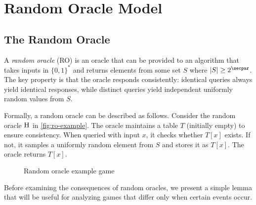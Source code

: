 \section{Random Oracle Model}\label{sec:rom}

\subsection{The Random Oracle}

A \emph{random oracle} (RO) is an oracle that can be provided to an algorithm that takes inputs in $\{0, 1\}^*$ and returns elements from some set $S$ where $|S| \geq 2^\secpar$.
The key property is that the oracle responds consistently: identical queries always yield identical responses, while distinct queries yield independent uniformly random values from $S$.

Formally, a random oracle can be described as follows.
Consider the random oracle ${\normalfont\textsc{H}}$ in \autoref{fig:ro-example}.
The oracle maintains a table $T$ (initially empty) to ensure consistency.
When queried with input $x$, it checks whether $T[x]$ exists. If not, it samples a uniformly random element from $S$ and stores it as $T[x]$.
The oracle returns $T[x]$.


\begin{figure}[tbhp]
  \begin{center}
    \begin{tcolorbox}[width=8cm]
      \begin{pchstack}
        \pchspace
      \end{pchstack}
    \end{tcolorbox}
  \end{center}
  \caption{Random oracle example game\label{fig:ro-example}}
\end{figure}

Before examining the consequences of random oracles, we present a simple lemma that will be useful for analyzing games that differ only when certain events occur.

